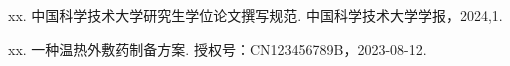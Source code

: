 \begin{achievements}

  \begin{theachievements}[已发表论文]
    \item xx. 中国科学技术大学研究生学位论文撰写规范. 中国科学技术大学学报，2024,1.
  \end{theachievements}

  \vspace{38bp}

  \begin{theachievements}[发明专利]
    \item xx. 一种温热外敷药制备方案. 授权号：CN123456789B，2023-08-12.
  \end{theachievements}
\end{achievements}
